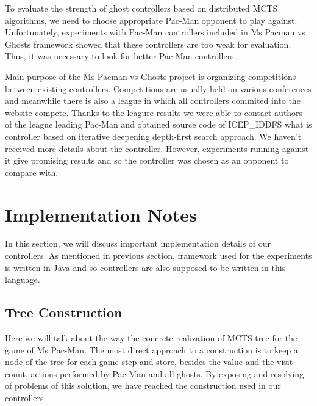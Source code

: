 To evaluate the strength of ghost controllers based on distributed MCTS algorithms, we need to
choose appropriate Pac-Man opponent to play against. Unfortunately, experiments with Pac-Man
controllers included in Ms Pacman vs Ghosts framework showed that these controllers are too
weak for evaluation. Thus, it was necessary to look for better Pac-Man controllers. 

Main purpose of the Ms Pacman vs Ghosts project is organizing competitions between existing
controllers. Competitions are usually held on various conferences and meanwhile there is also a
league  in which all controllers commited into the website compete. Thanks to the leagure
results we were able to contact authors of the league leading Pac-Man and obtained source code
of ICEP\_IDDFS \cite{IcepIddfs} what is controller based on iterative deepening depth-first
search approach. We haven't received more details about the controller. However, experiments
running against it give promising results and so the controller was chosen as an opponent to
compare with.




\section{Implementation Notes}
\label{sec_implementation_notes}

In this section, we will discuss important implementation details of our controllers. As
mentioned in previous section, framework used for the experiments is written in Java and so
controllers are also supposed to be written in this language.


\subsection{Tree Construction}

Here we will talk about the way the concrete realization of MCTS tree for the game of Ms
Pac-Man. The most direct approach to a construction is to keep a node of the tree for each game
step and store, besides the value and the visit count, actions performed by Pac-Man and all
ghosts. By exposing and resolving of problems of this solution, we have reached the
construction used in our controllers.

